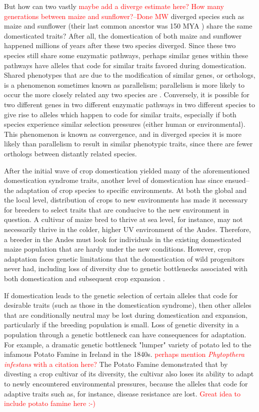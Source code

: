 \documentclass[12pt]{article}
\newcommand{\mbh}[1]{\textcolor{red}{\normalsize  #1}}
\begin{document}
But how can two vastly \mbh{maybe add a diverge estimate here?  How many generations between maize and sunflower?--Done MW} diverged species such as maize and sunflower  (their last common ancestor was 150 MYA \citep{Chang2004}) share the same domesticated traits? 
After all, the domestication of both maize and sunflower happened millions of years after these two species diverged.
Since these two species still share some enzymatic pathways, perhaps similar genes within these pathways have alleles that code for similar traits favored during domestication.
Shared phenotypes that are due to the modification of similar genes, or orthologs, is a phenomenon sometimes known as parallelism; parallelism is more likely to occur the more closely related any two species are \citep{Pickersgill2018}.
Conversely, it is possible for two different genes in two different enzymatic pathways in two different species to give rise to alleles which happen to code for similar traits, especially if both species experience similar selection pressures (either human or environmental).
This phenomenon is known as convergence, and in diverged species it is more likely than parallelism to result in similar phenotypic traits, since there are fewer orthologs between distantly related species.

After the initial wave of crop domestication yielded many of the aforementioned domestication syndrome traits, another level of domestication has since ensued--the adaptation of crop species to specific environments.
At both the global and the local level, distribution of crops to new environments has made it necessary for breeders to select traits that are conducive to the new environment in question.
A cultivar of maize bred to thrive at sea level, for instance, may not necessarily thrive in the colder, higher UV environment of the Andes.
Therefore, a breeder in the Andes must look for individuals in the existing domesticated maize population that are hardy under the new conditions.
However, crop adaptation faces genetic limitations that the domestication of wild progenitors never had, including loss of diversity due to genetic bottlenecks associated with both domestication and subsequent crop expansion \cite{Wang2017}. 

If domestication leads to the genetic selection of certain alleles that code for  desirable traits (such as those in the domestication syndrome), then other alleles that are conditionally neutral may be lost during domestication and expansion, particularly if the breeding population is small.
Loss of genetic diversity in a population through a genetic bottleneck can have consequences for adaptation.
For example, a dramatic genetic bottleneck "lumper" variety of potato led to the infamous Potato Famine in Ireland in the 1840s. \mbh{perhaps mention \emph{Phytopthera infestans} with a citation here?}
The Potato Famine demonstrated that by divesting a crop cultivar of its diversity, the cultivar also loses its ability to adapt to newly encountered environmental pressures, because the alleles that code for adaptive traits such as, for instance, disease resistance are lost. \mbh{Great idea to include potato famine here :-)}
\end{document}
